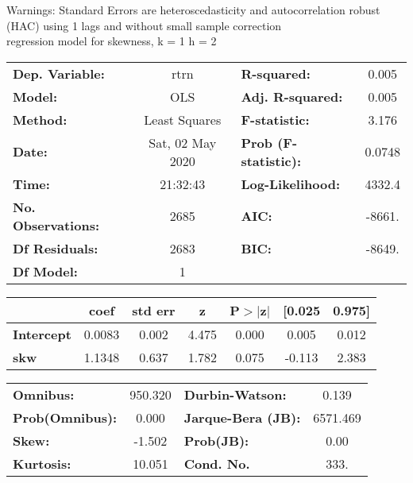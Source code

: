 Warnings: \newline
 [1] Standard Errors are heteroscedasticity and autocorrelation robust (HAC) using 1 lags and without small sample correction\\ 

regression model for skewness, k = 1 h = 2\begin{center}
\begin{tabular}{lclc}
\toprule
\textbf{Dep. Variable:}    &       rtrn       & \textbf{  R-squared:         } &     0.005   \\
\textbf{Model:}            &       OLS        & \textbf{  Adj. R-squared:    } &     0.005   \\
\textbf{Method:}           &  Least Squares   & \textbf{  F-statistic:       } &     3.176   \\
\textbf{Date:}             & Sat, 02 May 2020 & \textbf{  Prob (F-statistic):} &   0.0748    \\
\textbf{Time:}             &     21:32:43     & \textbf{  Log-Likelihood:    } &    4332.4   \\
\textbf{No. Observations:} &        2685      & \textbf{  AIC:               } &    -8661.   \\
\textbf{Df Residuals:}     &        2683      & \textbf{  BIC:               } &    -8649.   \\
\textbf{Df Model:}         &           1      & \textbf{                     } &             \\
\bottomrule
\end{tabular}
\begin{tabular}{lcccccc}
                   & \textbf{coef} & \textbf{std err} & \textbf{z} & \textbf{P$> |$z$|$} & \textbf{[0.025} & \textbf{0.975]}  \\
\midrule
\textbf{Intercept} &       0.0083  &        0.002     &     4.475  &         0.000        &        0.005    &        0.012     \\
\textbf{skw}       &       1.1348  &        0.637     &     1.782  &         0.075        &       -0.113    &        2.383     \\
\bottomrule
\end{tabular}
\begin{tabular}{lclc}
\textbf{Omnibus:}       & 950.320 & \textbf{  Durbin-Watson:     } &    0.139  \\
\textbf{Prob(Omnibus):} &   0.000 & \textbf{  Jarque-Bera (JB):  } & 6571.469  \\
\textbf{Skew:}          &  -1.502 & \textbf{  Prob(JB):          } &     0.00  \\
\textbf{Kurtosis:}      &  10.051 & \textbf{  Cond. No.          } &     333.  \\
\bottomrule
\end{tabular}
\end{center}

